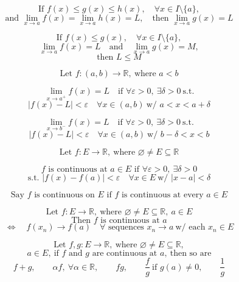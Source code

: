 \documentclass[11pt]{article}
\begin{document}

\[
\text{If } f(x)\le g(x)\le h(x),\quad \forall x\in I\setminus\{a\},
\]
\[
\text{and } \lim_{x\to a}f(x)=\lim_{x\to a}h(x)=L,\quad
\text{then } \lim_{x\to a}g(x)=L
\]


\[
\text{If } f(x)\le g(x),\quad \forall x\in I\setminus\{a\},
\]
\[
\lim_{x\to a}f(x)=L \quad \text{and} \quad \lim_{x\to a}g(x)=M,
\]
\[
\text{then } L\le M
\]

\[
\text{Let } f:(a,b)\to\mathbb R,\ \text{where } a<b
\]


\[
\lim_{x\to a^+} f(x)=L
\quad \text{if } \forall \varepsilon>0,\ \exists\delta>0\ \text{s.t.}
\]
\[
|f(x)-L|<\varepsilon
\quad \forall x\in(a,b)\ \text{w/ } a<x<a+\delta
\]


\[
\lim_{x\to b^-} f(x)=L
\quad \text{if } \forall \varepsilon>0,\ \exists\delta>0\ \text{s.t.}
\]
\[
|f(x)-L|<\varepsilon
\quad \forall x\in(a,b)\ \text{w/ } b-\delta<x<b
\]

\newpage


\[
\text{Let } f:E\to\mathbb R,\ \text{where } \varnothing\ne E\subseteq\mathbb R
\]


\[
f \text{ is continuous at } a\in E \text{ if } \forall\varepsilon>0,\ \exists\delta>0
\]
\[
\text{s.t. } |f(x)-f(a)|<\varepsilon
\quad \forall x\in E\ \text{w/ } |x-a|<\delta
\]

\[
\text{Say } f \text{ is continuous on } E
\text{ if } f \text{ is continuous at every } a\in E
\]


\[
\text{Let } f:E\to\mathbb R,\ \text{where } \varnothing\ne E\subseteq\mathbb R,\ a\in E
\]
\[
\text{Then } f \text{ is continuous at } a
\]
\[
\Longleftrightarrow\quad
f(x_n)\to f(a)\quad
\forall \text{ sequences } x_n\to a\ \text{w/ each } x_n\in E
\]


\[
\text{Let } f,g:E\to\mathbb R,\ \text{where } \varnothing\ne E\subseteq\mathbb R,
\]
\[
a\in E,\ \text{if } f \text{ and } g \text{ are continuous at } a,\ \text{then so are}
\]
\[
f+g,\qquad \alpha f,\ \forall \alpha\in\mathbb R,\qquad fg,\qquad
\frac{f}{g}\ \text{if }g(a)\ne0,\qquad \frac{1}{g}
\]
\end{document}

